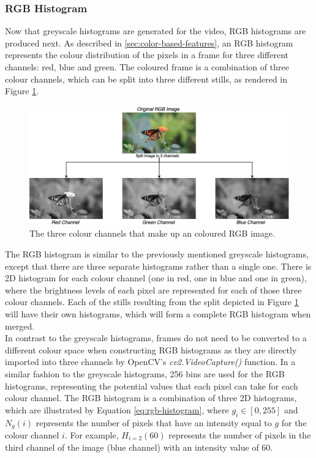 
\subsubsection{RGB Histogram}

Now that greyscale histograms are generated for the video, RGB histograms are produced next. As described in \ref{sec:color-based-features}, an RGB histogram represents the colour distribution of the pixels in a frame for three different channels: red, blue and green. The coloured frame is a combination of three colour channels, which can be split into three different stills, as rendered in Figure \ref{fig:implementation-rgb_image_channel_split}.

\begin{figure}[h] 
\centerline{\includegraphics[width=\textwidth]{figures/implementation/rgb_image_channel_split.png}}
\caption{\label{fig:implementation-rgb_image_channel_split}The three colour channels that make up an coloured RGB image.}
\end{figure}

The RGB histogram is similar to the previously mentioned greyscale histograms, except that there are three separate histograms rather than a single one. There is 2D histogram for each colour channel (one in red, one in blue and one in green), where the brightness levels of each pixel are represented for each of those three colour channels. Each of the stills resulting from the split depicted in Figure \ref{fig:implementation-rgb_image_channel_split} will have their own histograms, which will form a complete RGB histogram when merged.\\

In contrast to the greyscale histograms, frames do not need to be converted to a different colour space when constructing RGB histograms as they are directly imported into three channels by OpenCV's \textit{cv2.VideoCapture()} function. In a similar fashion to the greyscale histograms, 256 bins are used for the RGB histograms, representing the potential values that each pixel can take for each colour channel. The RGB histogram is a combination of three 2D histograms, which are illustrated by Equation \ref{eq:rgb-histogram}, where $g_i\in [0, 255]$ and $N_g(i)$ represents the number of pixels that have an intensity equal to $g$ for the colour channel $i$. For example, $H_{i=2}(60)$ represents the number of pixels in the third channel of the image (blue channel) with an intensity value of 60.

